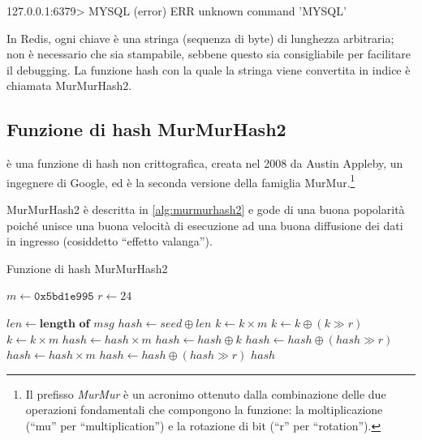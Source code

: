 \begin{commentedsource}[style=redis]
127.0.0.1:6379> MYSQL
(error) ERR unknown command 'MYSQL'
\end{commentedsource}

In Redis, ogni chiave è una stringa (sequenza di byte) di lunghezza arbitraria; non è
necessario che sia stampabile, sebbene questo sia consigliabile per facilitare il
debugging. La funzione hash con la quale la stringa viene convertita in indice è
chiamata MurMurHash2.

\subsection{Funzione di hash MurMurHash2}
\label{sec:redis:murmur}

 è una funzione di hash non
crittografica, creata nel 2008 da Austin Appleby, un ingegnere di Google, ed è la seconda versione
della famiglia MurMur.\footnote{Il prefisso \emph{MurMur} è un acronimo ottenuto dalla combinazione
delle due operazioni fondamentali che compongono la funzione: la moltiplicazione (``mu'' per
``multiplication'') e la rotazione di bit (``r'' per ``rotation'').}

MurMurHash2 è descritta in \autoref{alg:murmurhash2} e gode di una buona popolarità poiché unisce
una buona velocità di esecuzione ad una buona diffusione dei dati in ingresso (cosiddetto ``effetto
valanga'').

\begin{algorithm}
\caption{Funzione di hash MurMurHash2}
\label{alg:murmurhash2}
\begin{algorithmic}
	\State \lnote[2em]$m \gets \mathtt{0x5bd1e995}$ 
	\State \lnote[2em]$r \gets 24$ 

	\State $len \gets \textbf{length of}$ $msg$
	\State \lnote[2em]$hash \gets seed \oplus len$
	 
		\State \lnote[38pt]$k \gets k \times m$
		\State $k \gets k \oplus (k \gg r)$
		\State $k \gets k \times m$
		\State $hash \gets hash \times m$
		\State \lnote[38pt]$hash \gets hash \oplus k$
	\EndFor
	\State \lnote[2em]$hash \gets hash \oplus (hash \gg r)$ 
	\State $hash \gets hash \times m$
	\State $hash \gets hash \oplus (hash \gg r)$
	\State \Return $hash$
\EndProcedure
\end{algorithmic}
\end{algorithm}

